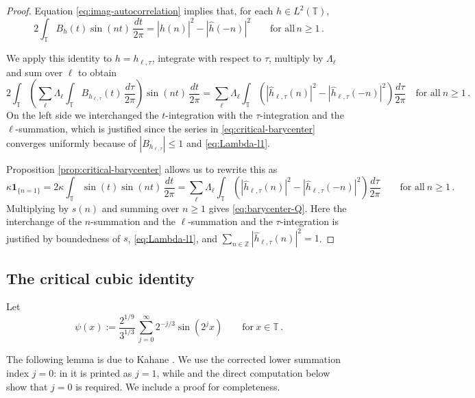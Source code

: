 \documentclass[11pt]{amsart}
\theoremstyle{definition}
\theoremstyle{remark}
\newcommand{\T}{\mathbb T}
\newcommand{\Z}{\mathbb Z}
\newcommand{\wh}{\widehat}
\begin{document}
\begin{proof}
    Equation \eqref{eq:imag-autocorrelation} implies that, for each $h\in L^2(\T)$,
    $$
    2 \int_\T B_h(t) \sin(nt)\,\frac{dt}{2\pi} = |\wh h(n)|^2 - |\wh h(-n)|^2 
    \qquad\text{for all}\, n\geq1 \,.
    $$

    We apply this identity to $h=h_{\ell,\tau}$, integrate with respect to $\tau$, multiply by $\Lambda_\ell$ and sum over $\ell$ to obtain
    $$
    2 \int_\T \left( \sum_{\ell} \Lambda_\ell \int_\T B_{h_{\ell,\tau}}(t)\,\frac{d\tau}{2\pi} \right) \sin(nt)\,\frac{dt}{2\pi} = \sum_{\ell} \Lambda_\ell \int_\T \left( |\wh h_{\ell,\tau}(n)|^2 - |\wh h_{\ell,\tau}(-n)|^2 \right)\frac{d\tau}{2\pi}
    \quad\text{for all}\ n\geq 1\,.
    $$
    On the left side we interchanged the $t$-integration with the $\tau$-integration and the $\ell$-summation, which is justified since the series in \eqref{eq:critical-barycenter} converges uniformly because of $|B_{h_{\ell,\tau}}|\leq1$ and \eqref{eq:Lambda-l1}.

    Proposition \ref{prop:critical-barycenter} allows us to rewrite this as
    $$
    \kappa \mathbf 1_{\{n=1\}} = 2\kappa \int_\T \sin(t) \sin(nt)\,\frac{dt}{2\pi}
    = \sum_{\ell} \Lambda_\ell \int_\T \left( |\wh h_{\ell,\tau}(n)|^2 - |\wh h_{\ell,\tau}(-n)|^2 \right)\frac{d\tau}{2\pi}
    \qquad\text{for all}\ n\geq 1    \,.
    $$
    Multiplying by $s(n)$ and summing over $n\geq1$ gives \eqref{eq:barycenter-Q}. Here the interchange of the $n$-summation and the $\ell$-summation and the $\tau$-integration is justified by boundedness of $s$, \eqref{eq:Lambda-l1}, and $\sum_{n\in\Z}|\wh h_{\ell,\tau}(n)|^2=1$.
\end{proof}






\subsection{The critical cubic identity}

Let
\begin{equation}\label{eq:kahane-function}
 \psi(x):= \frac{2^{1/9}}{3^{1/3}} \,\sum_{j=0}^{\infty}2^{-j/3}\sin(2^j x) \qquad\text{for}\ x\in\T \,.
\end{equation}

The following lemma is due to Kahane
\cite{Kahane2005}. We use the corrected lower summation
index $j=0$: in \cite[Eq.~(13)]{Kahane2005} it is printed as $j=1$, while
\cite[Eq.~(17)]{Kahane2005} and the direct computation below show that
$j=0$ is required. We include a proof for completeness.
\end{document}
